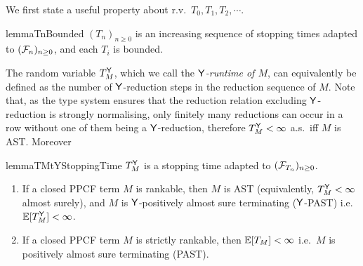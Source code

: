 We first state a useful property about r.v.~$T_0, T_1, T_2, \cdots$.
\begin{restatable}{lemma}{TnBounded}
\label{lem:TnBounded}
$(T_n)_{n \geq 0}$ is an increasing sequence of stopping times adapted to $(\mathcal{F}_n)_{n \geq 0}$, and each $T_i$ is bounded.
\end{restatable}


The random variable $T_M^{\mathsf{Y}}$, which we call the \emph{$\mathsf{Y}$-runtime of $M$}, can equivalently be defined as the number of $\mathsf{Y}$-reduction steps in the reduction sequence of $M$. 
Note that, as the type system ensures that the reduction relation excluding $\mathsf{Y}$-reduction is strongly normalising, only finitely many reductions can occur in a row without one of them being a $\mathsf{Y}$-reduction, therefore $T_M^{\mathsf{Y}} < \infty$ a.s.~iff $M$ is AST. 
Moreover 
\begin{restatable}{lemma}{TMtYStoppingTime}
\label{lem:TMtY is a stopping time}
$T_M^{\mathsf{Y}}$ is a stopping time adapted to $(\mathcal{F}_{T_n})_{n \geq 0}$.
\end{restatable}

\begin{theorem} \label{thm:rankable implies termination}
\begin{enumerate}
\item If a closed PPCF term $M$ is rankable, then $M$ is AST (equivalently, $T^{\mathsf{Y}}_M < \infty$ almost surely), and $M$ is $\mathsf{Y}$-positively almost sure terminating ($\mathsf{Y}$-PAST) i.e.~$\mathbb{E}[T^{\mathsf{Y}}_M] < \infty$. 

\item If a closed PPCF term $M$ is strictly rankable, then $\mathbb{E}[T_M] < \infty$ i.e.~$M$ is positively almost sure terminating (PAST).
\end{enumerate}
\end{theorem}

